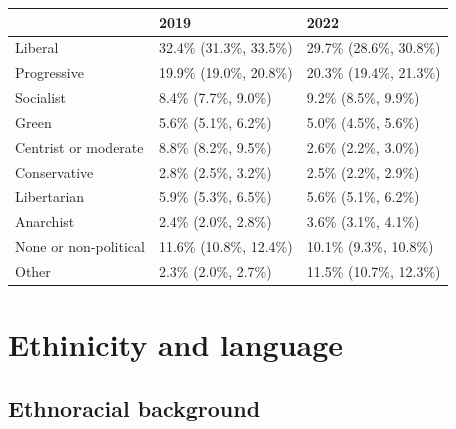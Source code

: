 \documentclass[
]{book}
\begin{document}
\begin{table}
\centering
\begin{tabular}[t]{>{}l|>{}l|>{}l}
\hline
  & 2019 & 2022\\
\hline
Liberal & 32.4\% (31.3\%, 33.5\%) & 29.7\% (28.6\%, 30.8\%)\\
\hline
Progressive & 19.9\% (19.0\%, 20.8\%) & 20.3\% (19.4\%, 21.3\%)\\
\hline
Socialist & 8.4\% (7.7\%, 9.0\%) & 9.2\% (8.5\%, 9.9\%)\\
\hline
Green & 5.6\% (5.1\%, 6.2\%) & 5.0\% (4.5\%, 5.6\%)\\
\hline
Centrist or moderate & 8.8\% (8.2\%, 9.5\%) & 2.6\% (2.2\%, 3.0\%)\\
\hline
Conservative & 2.8\% (2.5\%, 3.2\%) & 2.5\% (2.2\%, 2.9\%)\\
\hline
Libertarian & 5.9\% (5.3\%, 6.5\%) & 5.6\% (5.1\%, 6.2\%)\\
\hline
Anarchist & 2.4\% (2.0\%, 2.8\%) & 3.6\% (3.1\%, 4.1\%)\\
\hline
None or non-political & 11.6\% (10.8\%, 12.4\%) & 10.1\% (9.3\%, 10.8\%)\\
\hline
Other & 2.3\% (2.0\%, 2.7\%) & 11.5\% (10.7\%, 12.3\%)\\
\hline
\end{tabular}
\end{table}

\hypertarget{ethinicity-and-language}{%
\section{Ethinicity and language}\label{ethinicity-and-language}}

\hypertarget{ethnoracial-background}{%
\subsection{Ethnoracial background}\label{ethnoracial-background}}
\end{document}
